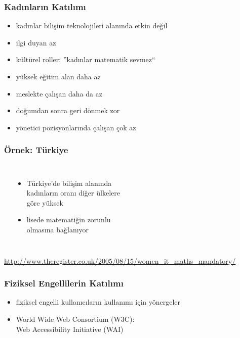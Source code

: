 \documentclass[dvipsnames]{beamer}
\theoremstyle{plain}
\begin{document}
\begin{frame}
  \frametitle{Kadınların Katılımı}

  \begin{itemize}
    \item kadınlar bilişim teknolojileri alanında etkin değil

    \bigskip
    \item ilgi duyan az
    \item kültürel roller: ''kadınlar matematik sevmez``

    \medskip
    \item yüksek eğitim alan daha az

    \medskip
    \item meslekte çalışan daha da az
    \item doğumdan sonra geri dönmek zor

    \medskip
    \item yönetici pozisyonlarında çalışan çok az
  \end{itemize}
\end{frame}

\begin{frame}
  \frametitle{Örnek: Türkiye}

  \begin{columns}
    \begin{center}
    \end{center}

    \begin{itemize}
      \item Türkiye'de bilişim alanında\\
        kadınların oranı diğer ülkelere\\
        göre yüksek
      \item lisede matematiğin zorunlu\\
        olmasına bağlanıyor
    \end{itemize}
  \end{columns}

  \medskip
  \tiny{\url{http://www.theregister.co.uk/2005/08/15/women_it_maths_mandatory/}}\\
\end{frame}

\begin{frame}
  \frametitle{Fiziksel Engellilerin Katılımı}

  \begin{itemize}
    \item fiziksel engelli kullanıcıların kullanımı için yönergeler
    \item World Wide Web Consortium (W3C):\\
      Web Accessibility Initiative (WAI)
  \end{itemize}
\end{frame}
\end{document}
